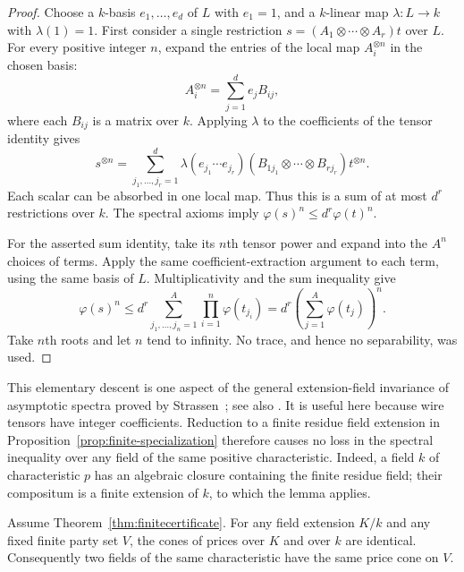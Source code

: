 \begin{proof}
Choose a $k$-basis $e_1,\ldots,e_d$ of $L$ with $e_1=1$,
and a $k$-linear map $\lambda:L\to k$ with $\lambda(1)=1$.
First consider a single restriction
$s=(A_1\otimes\cdots\otimes A_r)t$ over $L$.
For every positive integer $n$, expand the entries of the
local map $A_i^{\otimes n}$ in the chosen basis:
\[
 A_i^{\otimes n}=\sum_{j=1}^d e_j B_{ij},
\]
where each $B_{ij}$ is a matrix over $k$.  Applying $\lambda$
to the coefficients of the tensor identity gives
\[
 s^{\otimes n}=
 \sum_{j_1,\ldots,j_r=1}^d
 \lambda(e_{j_1}\cdots e_{j_r})
 (B_{1j_1}\otimes\cdots\otimes B_{rj_r})t^{\otimes n}.
\]
Each scalar can be absorbed in one local map.  Thus this
is a sum of at most $d^r$ restrictions over $k$.  The
spectral axioms imply
$\varphi(s)^n\leq d^r\varphi(t)^n$.

For the asserted sum identity, take its $n$th tensor
power and expand into the $A^n$ choices of terms.
Apply the same coefficient-extraction argument to each
term, using the same basis of $L$.  Multiplicativity and
the sum inequality give
\[
 \varphi(s)^n\leq
 d^r\sum_{j_1,\ldots,j_n=1}^A
        \prod_{i=1}^n\varphi(t_{j_i})
 =d^r\left(\sum_{j=1}^A\varphi(t_j)\right)^n.
\]
Take $n$th roots and let $n$ tend to infinity.  No trace,
and hence no separability, was used.
\end{proof}

This elementary descent is one aspect of the general
extension-field invariance of asymptotic spectra proved
by Strassen~\cite[Theorem~3.10]{Strassen1988}; see also
\cite[Remark~1.3, p.~7 of arXiv version~3]{cvz-universal}.
It is useful here because wire tensors have integer
coefficients.  Reduction to a finite residue field extension
in Proposition~\ref{prop:finite-specialization} therefore
causes no loss in the spectral inequality over any field
of the same positive characteristic.  Indeed, a field $k$
of characteristic $p$ has an algebraic closure containing
the finite residue field; their compositum is a finite
extension of $k$, to which the lemma applies.

\begin{theorem}
\label{thm:price-characteristic}
Assume Theorem~\ref{thm:finitecertificate}.  For any field extension
$K/k$ and any fixed finite party set $V$, the cones of prices over
$K$ and over $k$ are identical.  Consequently two fields of the
same characteristic have the same price cone on $V$.
\end{theorem}

